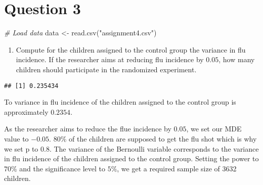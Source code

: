 \documentclass[
]{article}
\newenvironment{Shaded}{\begin{snugshade}}{\end{snugshade}}
\newcommand{\CommentTok}[1]{\textcolor[rgb]{0.56,0.35,0.01}{\textit{#1}}}
\newcommand{\DecValTok}[1]{\textcolor[rgb]{0.00,0.00,0.81}{#1}}
\newcommand{\FunctionTok}[1]{\textcolor[rgb]{0.00,0.00,0.00}{#1}}
\newcommand{\NormalTok}[1]{#1}
\newcommand{\OtherTok}[1]{\textcolor[rgb]{0.56,0.35,0.01}{#1}}
\newcommand{\SpecialCharTok}[1]{\textcolor[rgb]{0.00,0.00,0.00}{#1}}
\newcommand{\StringTok}[1]{\textcolor[rgb]{0.31,0.60,0.02}{#1}}
\providecommand{\tightlist}{%
  \setlength{\itemsep}{0pt}\setlength{\parskip}{0pt}}
\begin{document}
\hypertarget{question-3}{%
\section{Question 3}\label{question-3}}

\begin{Shaded}
\begin{Highlighting}[]
\CommentTok{\# Load data}
\NormalTok{data }\OtherTok{\textless{}{-}} \FunctionTok{read.csv}\NormalTok{(}\StringTok{"assignment4.csv"}\NormalTok{)}
\end{Highlighting}
\end{Shaded}

\begin{enumerate}
\def\labelenumi{\alph{enumi})}
\tightlist
\item
  Compute for the children assigned to the control group the variance in
  flu incidence. If the researcher aims at reducing flu incidence by
  \(0.05\), how many children should participate in the randomized
  experiment.
\end{enumerate}

\begin{Shaded}
\end{Shaded}

\begin{verbatim}
## [1] 0.235434
\end{verbatim}

To variance in flu incidence of the children assigned to the control
group is approximately \(0.2354\).

As the researcher aims to reduce the flue incidence by \(0.05\), we set
our MDE value to \(-0.05\). \(80\%\) of the children are supposed to get
the flu shot which is why we set p to \(0.8\). The variance of the
Bernoulli variable corresponds to the variance in flu incidence of the
children assigned to the control group. Setting the power to \(70\%\)
and the significance level to \(5\%\), we get a required sample size of
3632 children.
\end{document}
